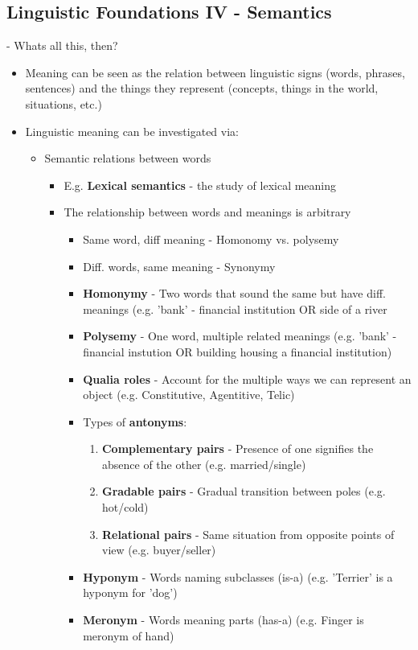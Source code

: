 \documentclass[11pt]{article}
\newenvironment{itemise}{
\begin{itemize}
  \setlength{\itemsep}{1pt}
  \setlength{\parskip}{0pt}
  \setlength{\parsep}{0pt}
}{\end{itemize}}
\begin{document}
\subsection{Linguistic Foundations IV - Semantics}
- Whats all this, then?
\begin{itemise}
 \item Meaning can be seen as the relation between linguistic signs (words, phrases, sentences) and the things they represent (concepts, things in the world, situations, etc.)
 \item Linguistic meaning can be investigated via: 
  \begin{itemise}
   \item Semantic relations between words
    \begin{itemise}
     \item E.g. {\bf Lexical semantics} - the study of lexical meaning
     \item The relationship between words and meanings is arbitrary
      \begin{itemise}
       \item Same word, diff meaning - Homonomy vs. polysemy
       \item Diff. words, same meaning - Synonymy
       \item {\bf Homonymy} - Two words that sound the same but have diff. meanings (e.g. 'bank' - financial institution OR side of a river
       \item {\bf Polysemy} - One word, multiple related meanings (e.g. 'bank' - financial instution OR building housing a financial institution) 
       \item {\bf Qualia roles} - Account for the multiple ways we can represent an object (e.g. Constitutive, Agentitive, Telic)
       \item Types of {\bf antonyms}:
	\begin{enumerate}
	 \item {\bf Complementary pairs} - Presence of one signifies the absence of the other (e.g. married/single)
	 \item {\bf Gradable pairs} - Gradual transition between poles (e.g. hot/cold)
	 \item {\bf Relational pairs} - Same situation from opposite points of view (e.g. buyer/seller)
	\end{enumerate}
       \item {\bf Hyponym} - Words naming subclasses (is-a) (e.g. 'Terrier' is a hyponym for 'dog')
       \item {\bf Meronym} - Words meaning parts (has-a) (e.g. Finger is meronym of hand) 

\end{itemise}
\end{itemise}
\end{itemise}
\end{itemise}
\end{document}
